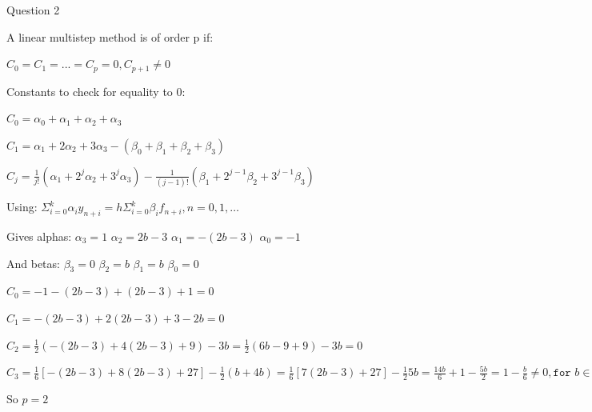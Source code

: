 \documentclass{beamer}
\begin{document}
\begin{frame}{Question 2}

A linear multistep method is of order p if:

$C_0 = C_1 = ... = C_p = 0, C_{p+1} \ne 0$

Constants to check for equality to 0:

$C_0 = \alpha_0 + \alpha_1 + \alpha_2 + \alpha_3$

$C_1 = \alpha_1 + 2\alpha_2 + 3\alpha_3 - (\beta_0 + \beta_1 + \beta_2 + \beta_3)$

$C_j = \frac{1}{j!} (\alpha_1 + 2^j\alpha_2 + 3^j\alpha_3) - \frac{1}{(j-1)!} (\beta_1 + 2^{j-1}\beta_2 + 3^{j-1}\beta_3)$

Using: $\Sigma_{i=0}^{k}\alpha_iy_{n+i} = h \Sigma_{i=0}^{k} \beta_i f_{n+i}, n=0,1,\ldots$

Gives alphas: $\alpha_3 = 1$ $\alpha_2 = 2b - 3$ $\alpha_1 = -(2b - 3)$ $\alpha_0 = -1$

And betas: $\beta_3 = 0$ $\beta_2 = b$ $\beta_1 = b$ $\beta_0 = 0$

$C_0 = -1 - (2b - 3) + (2b - 3) + 1 = 0$

$C_1 = -(2b - 3) + 2(2b-3) + 3 - 2b = 0$

$C_2 = \frac{1}{2}(-(2b-3) + 4(2b-3) + 9) - 3b = \frac{1}{2} (6b - 9 + 9) - 3b = 0$

$C_3 = \frac{1}{6}[-(2b-3) + 8(2b-3) + 27] - \frac{1}{2}(b+4b) = \frac{1}{6}[7(2b-3) + 27] - \frac{1}{2}5b = \frac{14b}{6} + 1 - \frac{5b}{2} = 1 - \frac{b}{6} \ne 0, \texttt{for } b \in (0,2)$

So $p = 2$

\end{frame}
\end{document}
